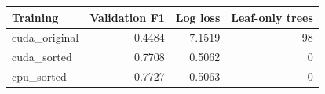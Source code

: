 \begin{tabular}{lrrr}
\toprule
Training & Validation F1 & Log loss & Leaf-only trees \\
\midrule
cuda\_original & 0.4484 & 7.1519 & 98 \\
cuda\_sorted & 0.7708 & 0.5062 & 0 \\
cpu\_sorted & 0.7727 & 0.5063 & 0 \\
\bottomrule
\end{tabular}
